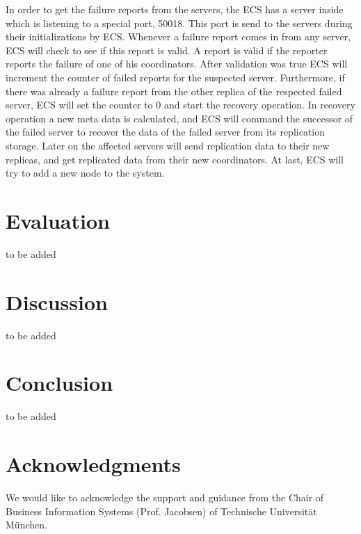 \documentclass{sig-alternate}
\begin{document}
In order to get the failure reports from the servers, the ECS has a server inside which is listening to a special port, 50018. This port is send to the servers during their initializations by ECS. Whenever a failure report comes in from any server, ECS will check to see if this report is valid. A report is valid if the reporter reports the failure of one of his coordinators. After validation was true ECS will increment the counter of failed reports for the suspected server. Furthermore, if there was already a failure report from the other replica of the respected failed server, ECS will set the counter to 0 and start the recovery operation. In recovery operation a new meta data is calculated, and ECS will command the successor of the failed server to recover the data of the failed server from its replication storage. Later on the affected servers will send replication data to their new replicas, and get replicated data from their new coordinators. At last, ECS will try to add a new node to the system.

\section{Evaluation}
to be added
\section{Discussion}
to be added
\section{Conclusion}
to be added

\section{Acknowledgments}
We would like to acknowledge the support and guidance from the  Chair of Business Information Systems (Prof. Jacobsen) of Technische Universit{\"a}t M{\"u}nchen.
%

%
%

\end{document}
